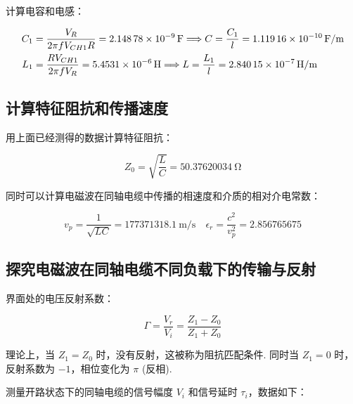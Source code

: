 \documentclass{customDoc}
\begin{document}
计算电容和电感：

\begin{equation}
    \begin{aligned}
    C_1 &= \frac{V_R}{2\pi fV_{CH1}R} = \SI{2.14878E-09}{\farad} \Longrightarrow C = \frac{C_1}{l} = \SI{1.11916E-10}{\farad/\metre} \\
    L_1 &= \frac{RV_{CH1}}{2\pi fV_R} = \SI{5.4531E-06}{\henry} \Longrightarrow L = \frac{L_1}{l} = \SI{2.84015E-07}{\henry/\metre}
    \end{aligned}
\end{equation}

\subsection{计算特征阻抗和传播速度}

用上面已经测得的数据计算特征阻抗：

\begin{equation}
    Z_0 = \sqrt{\frac{L}{C}} = \SI{50.37620034}{\ohm}
\end{equation}

同时可以计算电磁波在同轴电缆中传播的相速度和介质的相对介电常数：

\begin{equation}
    v_p = \frac{1}{\sqrt{LC}} = \SI{177371318.1}{\metre/\second} \quad \epsilon_r = \frac{c^2}{v_p^2} = 2.856765675
\end{equation}

\subsection{探究电磁波在同轴电缆不同负载下的传输与反射}

界面处的电压反射系数：

\begin{equation}
    \Gamma = \frac{V_r}{V_i} = \frac{Z_1 - Z_0}{Z_1 + Z_0}
\end{equation}

理论上，当 $Z_1 = Z_0$ 时，没有反射，这被称为阻抗匹配条件. 同时当 $Z_1 = 0$ 时，反射系数为 $-1$，相位变化为 $\pi$ (反相).

测量开路状态下的同轴电缆的信号幅度 $V_i$ 和信号延时 $\tau_i$，数据如下：
\end{document}
